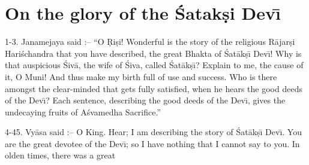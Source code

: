 \chapter{On the glory of the \'Satak\d{s}i Dev\={\i}}

1-3. Janamejaya said :-- ``O \d{R}i\d{s}i! Wonderful is the story of the religious R\=ajar\d{s}i Hari\'schandra that you have described, the great Bhakta of \'Sat\=ak\d{s}\={\i} Dev\={\i}! Why is that auspicious \'Siv\=a, the wife of \'Siva, called \'Sat\=ak\d{s}\={\i}? Explain to me, the cause of it, O Muni! And thus make my birth full of use and success. Who is there amongst the clear-minded that gets fully satisfied, when he hears the good deeds of the Dev\={\i}? Each sentence, describing the good deeds of the Dev\={\i}, gives the undecaying fruits of A\'svamedha Sacrifice.''

4-45. Vy\=asa said :-- O King. Hear; I am describing the story of \'Sat\=ak\d{s}\={\i} Dev\={\i}. You are the great devotee of the Dev\={\i}; so I have nothing that I cannot say to you. In olden times, there was a great

